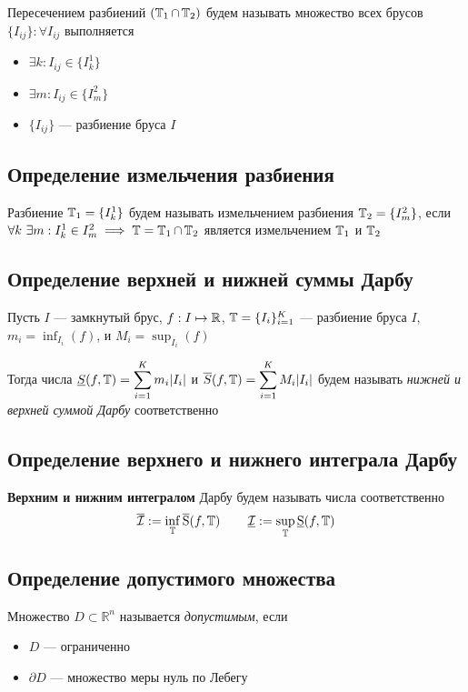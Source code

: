 \documentclass[a4paper]{article}
\begin{document}
Пересечением разбиений $(\operatorname{\mathbb{T}}_1 \cap \operatorname{\mathbb{T}}_2)$ будем называть множество всех брусов $\{I_{ij}\}: \forall I_{ij}$ выполняется
\begin{itemize}
    \item $\exists k: I_{ij} \in \{I^1_k\}$
    \item $\exists m: I_{ij} \in \{I^2_m\}$
    \item $\{I_{ij}\}$ — разбиение бруса $I$
\end{itemize}

\subsection{Определение измельчения разбиения}
 Разбиение $\operatorname{\mathbb{T}}_1 = \{I^1_k\}$ будем называть измельчением разбиения $\operatorname{\mathbb{T}}_2 = \{I^2_m\}$, если $\forall k\ \exists m: I_k^1 \in I_m^2 \implies \operatorname{\mathbb{T}} = \operatorname{\mathbb{T}}_1\cap \operatorname{\mathbb{T}}_2$ является измельчением $\operatorname{\mathbb{T}}_1$ и $\operatorname{\mathbb{T}}_2$



\subsection{Определение верхней и нижней суммы Дарбу}
 Пусть $I$ — замкнутый брус, $f: I\mapsto \operatorname{\mathbb{R}}$, $\operatorname{\mathbb{T}} = \{I_i\}_{i=1}^{K}$ — разбиение бруса $I$, $m_i = \displaystyle\inf_{I_i} (f)$, и $M_i = \displaystyle\sup_{I_i} (f)$

Тогда числа $\underline{S}(f, \T) = \sum_{i=1}^{K}m_i|I_i|$ и $\overline{S}(f, \T) = \sum_{i=1}^KM_i|I_i|$ будем называть \textit{нижней и верхней суммой Дарбу} соответственно

\subsection{Определение верхнего и нижнего интеграла Дарбу}
 \textbf{Верхним и нижним интегралом} Дарбу будем называть числа соответственно
\begin{equation*}
    \operatorname{\overline{\mathcal{I}}} := \inf_{\operatorname{\mathbb{T}}}\operatorname{\overline{S}}(f, \operatorname{\mathbb{T}}) \qquad \operatorname{\underline{\mathcal{I}}} := \sup_{\operatorname{\mathbb{T}}}\operatorname{\underline{S}}(f, \operatorname{\mathbb{T}})
\end{equation*}

\subsection{Определение допустимого множества}
 Множество $D\subset\mathbb{R}^n$ называется \textit{допустимым}, если
\begin{itemize}
    \item $D$ — ограниченно
    \item $\partial D$ — множество меры нуль по Лебегу
\end{itemize}
\end{document}
